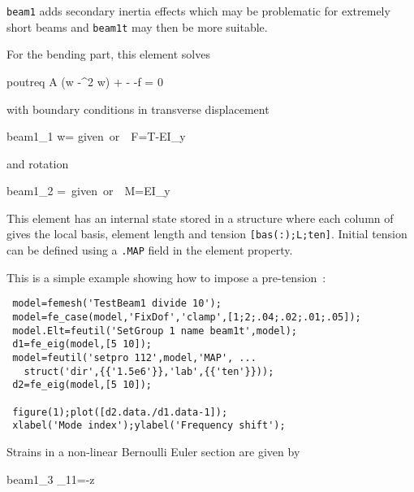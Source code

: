 {\tt beam1} adds secondary inertia effects which may be problematic for extremely short beams and {\tt beam1t} may then be more suitable.


For the bending part, this element solves
%
\begin{eqsvg}{poutreq}
\rho A (\ddot w -\Omega^2 w) + 
-  -f = 0 
\end{eqsvg}
%
with boundary conditions in transverse displacement
%
\begin{eqsvg}{beam1_1}
w= \hbox{given or}\ \ F=T-EI_y
\end{eqsvg}
%
and rotation
%
\begin{eqsvg}{beam1_2}
=\ \hbox{given or}\ \ M=EI_y
\end{eqsvg}


This element has an internal state stored in a  structure where each column of  gives the local basis, element length and tension {\tt [bas(:);L;ten]}. Initial tension can be defined using a {\tt .MAP} field in the element property. 

This is a simple example showing how to impose a pre-tension~:

\begin{verbatim}
 model=femesh('TestBeam1 divide 10');
 model=fe_case(model,'FixDof','clamp',[1;2;.04;.02;.01;.05]);
 model.Elt=feutil('SetGroup 1 name beam1t',model);
 d1=fe_eig(model,[5 10]); 
 model=feutil('setpro 112',model,'MAP', ...
   struct('dir',{{'1.5e6'}},'lab',{{'ten'}}));
 d2=fe_eig(model,[5 10]); 

 figure(1);plot([d2.data./d1.data-1]);
 xlabel('Mode index');ylabel('Frequency shift');
\end{verbatim}%


Strains in a non-linear Bernoulli Euler section are given by 

\begin{eqsvg}{beam1_3}
\epsilon_{11}=-z
\end{eqsvg}
%


